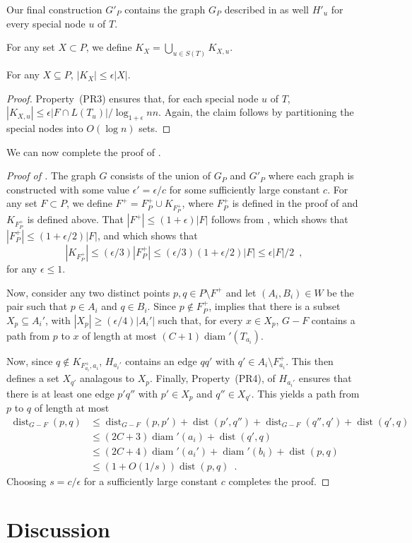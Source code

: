 \documentclass{patmorin}
\DeclareMathOperator{\diam}{diam}
\DeclareMathOperator{\dist}{dist}
\begin{document}
Our final construction $G'_P$ contains the graph $G_P$ described in
 as well $H'_u$ for every special node $u$ of $T$.

For any set $X\subset P$, we define $K_{X} = \bigcup_{u\in
S(T)} K_{X,u}$.

\begin{clm}
  For any $X\subseteq P$, $|K_{X}| \le \epsilon|X|$.
\end{clm}

\begin{proof}
  Property~(PR3) ensures that, for each special node $u$ of $T$,
  $|K_{X,u}|\le \epsilon|F\cap L(T_u)|/\log_{1+\epsilon} n n$.  Again, the
  claim follows by partitioning the special nodes into $O(\log n)$ sets.
\end{proof}

We can now complete the proof of .

\begin{proof}[Proof of ]
  The graph $G$ consists of the union of $G_P$ and $G'_P$ where each
  graph is constructed with some value $\epsilon' = \epsilon/c$ for
  some sufficiently large constant $c$.  For any set $F\subset P$, we
  define $F^+ = F^+_P \cup K_{F^+_P}$, where $F^+_P$ is defined in the
  proof of  and $K_{F^+_P}$ is defined above.  
  That $|F^+| \le (1+\epsilon)|F|$
  follows from , which shows that $|F^+_P|\le
  (1+\epsilon/2)|F|$, and  which shows that 
  \[
     |K_{F^+_P}|\le (\epsilon/3)|F^+_P|\le (\epsilon/3)(1+\epsilon/2)|F|
     \le \epsilon|F|/2 \enspace ,
  \]
  for any $\epsilon \le 1$.

  Now, consider any two distinct points $p,q\in P\setminus F^+$ and
  let $(A_i,B_i)\in W$ be the pair such that $p\in A_i$ and $q\in B_i$.
  Since $p\not\in F^+_P$,  implies that there is a
  subset $X_{p}\subseteq A_i'$, with $|X_{p}|\ge (\epsilon/4)|A_i'|$
  such that, for every $x\in X_{p}$, $G-F$ contains a path from $p$
  to $x$ of length at most $(C+1)\diam'(T_{a_i})$.
  
  Now, since $q\not\in K_{F^+_{a_i},a_i}$, $H_{a_i'}$ contains an edge
  $qq'$ with $q'\in A_i\setminus F^+_{a_i}$.  This then defines a set
  $X_{q'}$ analagous to $X_{p}$.  Finally, Property~(PR4), of $H_{a_i'}$
  ensures that there is at least one edge $p'q''$ with $p'\in X_{p}$
  and $q''\in X_{q'}$.  This yields a path from $p$ to $q$ of length at most
  \begin{align*}
    \dist_{G-F}(p,q) & \le \dist_{G-F}(p,p') + \dist(p',q'') + \dist_{G-F}(q'',q') + \dist(q',q) \\
      & \le (2C+3)\diam'(a_i) + \dist(q',q) \\
      & \le (2C+4)\diam'(a_i') + \diam'(b_i) + \dist(p,q) \\
      & \le (1+O(1/s))\dist(p,q) \enspace . 
  \end{align*}
  Choosing $s = c/\epsilon$ for a sufficiently large constant $c$
  completes the proof.
\end{proof}

\section{Discussion}





\end{document}
